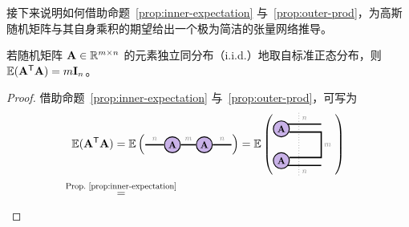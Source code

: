 接下来说明如何借助命题~\ref{prop:inner-expectation} 与~\ref{prop:outer-prod}，为高斯随机矩阵与其自身乘积的期望给出一个极为简洁的张量网络推导。 
\begin{proposition}\label{prop:wishart-mean}
若随机矩阵 $\mathbf{A}\in\mathbb{R}^{m\times n}$ 的元素独立同分布（i.i.d.）地取自标准正态分布，则 $\mathbb{E}(\mathbf{A}^{\mathsf{T}}\mathbf{A}) = m\mathbf{I}_n$。 
\begin{proof}
        借助命题~\ref{prop:inner-expectation} 与~\ref{prop:outer-prod}，可写为 
\begin{align*}
\EE(\Ab^\ts\Ab) 
&= 
\EE\left(\begin{tikzpicture}[baseline=\baseline]
    \tikzset{tensor/.style = {minimum size = 0.5cm,shape = circle,thick,draw=black,inner sep = 0pt}, edge/.style = {thick,line width=.4mm},every loop/.style={}}
    \def\y{0}
    \def\x{0}
    \node[tensor,fill=red!30!blue!30!white] (A1) at (\x,\y){\scalebox{0.85}{$\Ab$}};
    \node[tensor,fill=red!30!blue!30!white] (A2) at (\x+1,\y){\scalebox{0.85}{$\Ab$}};
    \draw[edge](A1) -- (A2) node [midway, above]{\scalebox{0.7}{\dimcolor{$m$}}};
    \draw[edge](A1) -- (\x-0.85,\y) node [midway, above]{\scalebox{0.7}{\dimcolor{$n$}}};
    \draw[edge](A2) -- (\x+1.85,\y) node [midway, above]{\scalebox{0.7}{\dimcolor{$n$}}};
\end{tikzpicture}\right)
=
\EE\left(\begin{tikzpicture}[baseline=\baseline]
    \tikzset{tensor/.style = {minimum size = 0.5cm,shape = circle,thick,draw=black,inner sep = 0pt}, edge/.style = {thick,line width=.4mm},every loop/.style={}}
    \def\y{0}
    \def\x{0}
    \node[tensor,fill=red!30!blue!30!white] (A2) at (\x,\y-0.5){\scalebox{0.85}{$\Ab$}};
    \node[tensor,fill=red!30!blue!30!white] (A1) at (\x,\y+0.5){\scalebox{0.85}{$\Ab$}};
    \draw[edge](\x+0.25,\y+0.4) -- (\x+1.25,\y+0.4) -- (\x+1.25,\y-0.4) -- (\x+0.25,\y-0.4);
    \draw[edge](\x+0.2,\y+0.65)--(\x+1.25,\y+0.65)node [midway, above]{\scalebox{0.7}{\dimcolor{$n$}}};
    \draw[edge](\x+0.2,\y-0.65)--(\x+1.25,\y-0.65)node [midway, below]{\scalebox{0.7}{\dimcolor{$n$}}};
    \node[draw=none] () at (\x+1.45,\y) {\scalebox{0.7}{\dimcolor{$m$}}};
    \draw[dotted](\x+0.55,\y+1)--(\x+0.55,\y-1);
\end{tikzpicture}\right)\\
\ \
&\textequal{Prop.~\ref{prop:inner-expectation}}
\ \
\begin{tikzpicture}[baseline=\baseline]
   \tikzset{tensor/.style = {minimum size = 0.5cm,shape = circle,thick,draw=black,inner sep = 0pt}, edge/.style = {thick,line width=.4mm},every loop/.style={}}

\end{tikzpicture}
\end{align*}
\end{proof}
\end{proposition}
